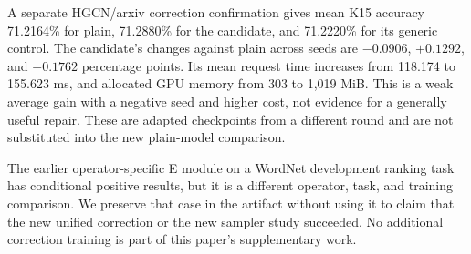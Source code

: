 A separate HGCN/arxiv correction confirmation gives mean K15 accuracy 71.2164\% for plain, 71.2880\% for the candidate, and 71.2220\% for its generic control. The candidate's changes against plain across seeds are $-0.0906$, $+0.1292$, and $+0.1762$ percentage points. Its mean request time increases from 118.174 to 155.623 ms, and allocated GPU memory from 303 to 1,019 MiB. This is a weak average gain with a negative seed and higher cost, not evidence for a generally useful repair. These are adapted checkpoints from a different round and are not substituted into the new plain-model comparison.

The earlier operator-specific E module on a WordNet development ranking task has conditional positive results, but it is a different operator, task, and training comparison. We preserve that case in the artifact without using it to claim that the new unified correction or the new sampler study succeeded. No additional correction training is part of this paper's supplementary work.

